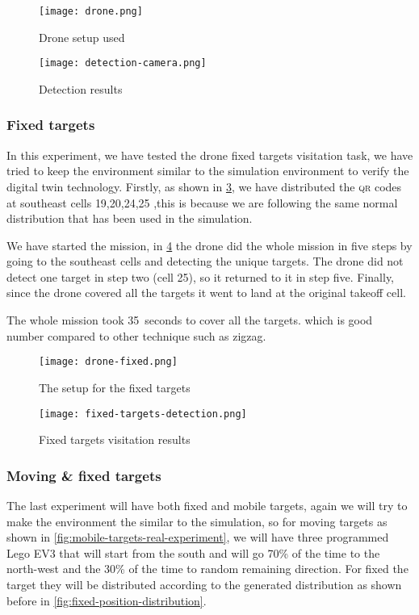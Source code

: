 \documentclass[../main.tex]{subfiles}
\begin{document}
\begin{figure}[H]
	\centering
	\texttt{[image: drone.png]}
	\caption{Drone setup used}
	\label{fig:experiment-drone}
\end{figure} 

\begin{figure}[H]
	\centering
	\texttt{[image: detection-camera.png]}
	\caption{Detection results}
	\label{fig:detection-camera}
\end{figure}

\subsubsection{Fixed targets}
In this experiment, we have tested the drone fixed targets
visitation task, we have tried to keep the environment similar
to the simulation environment to verify the digital twin technology.
Firstly, as shown in \cref{fig:targets-location},
we have distributed the \textsc{qr} codes at southeast cells 
{19,20,24,25} ,this is because we are following 
the same normal distribution that has been used in the simulation.

We have started the mission, in \cref{fig:fixed-location-detection-camera}
the drone did the whole mission in five steps by going
to the southeast cells and detecting the unique targets. 
The drone did not detect one target in 
step two (cell 25), so it returned to it in step five. Finally,
since the drone covered all the targets it 
went to land at the original takeoff cell.

The whole mission took \SI{35}{seconds} to cover all the targets.
which is good number compared to other technique such as zigzag.

\begin{figure}[H]
	\centering
	\texttt{[image: drone-fixed.png]}
	\caption{The setup for the fixed targets}
	\label{fig:targets-location}
\end{figure}


\begin{figure}[H]
	\centering
	\texttt{[image: fixed-targets-detection.png]}
	\caption{Fixed targets visitation results}
	\label{fig:fixed-location-detection-camera}
\end{figure}


\subsubsection{Moving \& fixed targets}
The last experiment will have both fixed and mobile targets,
again we will try to make the environment the similar to the 
simulation, so for moving targets as shown in 
\cref{fig:mobile-targets-real-experiment}, we will have 
three programmed Lego EV3 that will start 
from the south and will go 70\% of the time to the north-west 
and the 30\% of the time to random remaining direction. For fixed
the target they will be distributed according to the generated distribution
as shown before in \cref{fig:fixed-position-distribution}.
\end{document}
